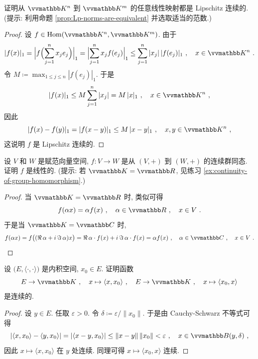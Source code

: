 \begin{exercise}
    证明从 \(\K^n\) 到 \(\K^m\) 的任意线性映射都是 Lipschitz 连续的. (提示: 利用命题 \ref{prop:Lp-norms-are-equivalent} 并选取适当的范数.)
\end{exercise}

\begin{proof}
    设 \(f \in \Hom(\K^n, \K^m)\). 由于
    \[
        |f(x)|_1 = \Bigl|f \Bigl(\sum_{j = 1}^n x_j e_j\Bigr)\Bigr|_1 = \Bigl|\sum_{j = 1}^n x_j f(e_j)\Bigr|_1 \leq \sum_{j = 1}^n |x_j|\, |f(e_j)|_1\ ,\quad x \in \K^n\ .
    \]
    令 \(M \coloneqq \max_{1 \leq j \leq n} |f(e_j)|_1\). 于是
    \[
        |f(x)|_1 \leq M \sum_{j = 1}^n |x_j| = M\, |x|_1\ ,\quad x \in \K^n\ ,
    \]
    因此
    \[
        |f(x) - f(y)|_1 = |f(x - y)|_1 \leq M\, |x - y|_1\ ,\quad x, y \in \K^n\ ,
    \]
    这说明 \(f\) 是 Lipschitz 连续的.
\end{proof}

\begin{exercise}
    设 \(V\) 和 \(W\) 是赋范向量空间, \(f \colon V \to W\) 是从 \((V, +)\) 到 \((W, +)\) 的连续群同态. 证明 \(f\) 是线性的. (提示: 若 \(\K = \R\), 见练习 \ref{ex:continuity-of-group-homomorphism}.)
\end{exercise}

\begin{proof}
    当 \(\K = \R\) 时, 类似可得
    \[
        f(\alpha x) = \alpha f(x)\ ,\quad \alpha \in \R\ ,\quad x \in V\ .
    \]
    于是当 \(\K = \C\) 时,
    \[
        f(\alpha x) = f\bigl((\Re \alpha + \ii \Im \alpha) x\bigr) = \Re \alpha \cdot f(x) + \ii \Im \alpha \cdot f(x) = \alpha f(x)\ ,\quad \alpha \in \C\ ,\quad x \in V\ .
    \]
\end{proof}

\begin{exercise}
    设 \(\bigl(E, \langle \cdot, \cdot \rangle\bigr)\) 是内积空间, \(x_0 \in E\). 证明函数
    \[
         E \to \K\ ,\quad x \mapsto \langle x, x_0 \rangle\ ,\quad E \to \K\ ,\quad x \mapsto \langle x_0, x \rangle
    \]
    是连续的.
\end{exercise}

\begin{proof}
    设 \(y \in E\). 任取 \(\varepsilon > 0\). 令 \(\delta \coloneqq \varepsilon \big/ \|x_0\|\). 于是由 Cauchy-Schwarz 不等式可得
    \[
        |\langle x, x_0 \rangle - \langle y, x_0 \rangle| = |\langle x - y, x_0 \rangle| \leq \|x - y\|\, \|x_0\| < \varepsilon\ ,\quad x \in \B(y, \delta)\ ,
    \]
    因此 \(x \mapsto \langle x, x_0 \rangle\) 在 \(y\) 处连续. 同理可得 \(x \mapsto \langle x_0, x \rangle\) 连续.
\end{proof}

